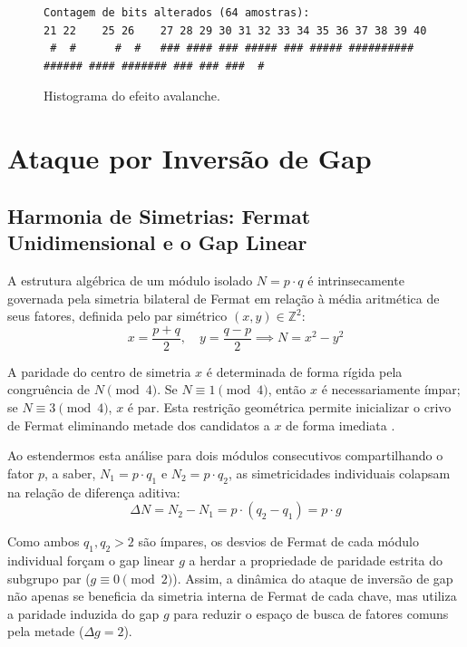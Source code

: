 \documentclass[12pt,a4paper]{article}
\theoremstyle{plain}
\begin{document}
\begin{figure}[htbp]
\centering
\begin{minipage}{0.7\textwidth}
\centering
\vspace{0.5cm}
{\footnotesize
\begin{verbatim}
Contagem de bits alterados (64 amostras):
21 22    25 26    27 28 29 30 31 32 33 34 35 36 37 38 39 40
 #  #      #  #   ### #### ### ##### ### ##### ########## ###### #### ####### ### ### ###  #
\end{verbatim}
}
\caption{Histograma do efeito avalanche.}
\label{fig:hist_avalanche}
\end{minipage}
\end{figure}

\section{Ataque por Inversão de Gap}
\label{sec:gap_inversion}

\subsection{Harmonia de Simetrias: Fermat Unidimensional e o Gap Linear}

A estrutura algébrica de um módulo isolado $N = p \cdot q$ é
intrinsecamente governada pela simetria bilateral de Fermat em relação
à média aritmética de seus fatores, definida pelo par simétrico
$(x, y) \in \mathbb{Z}^2$:
\[
x = \frac{p+q}{2}, \quad
y = \frac{q-p}{2} \implies
N = x^2 - y^2
\]

A paridade do centro de simetria $x$ é determinada de forma rígida
pela congruência de $N \pmod 4$.  Se $N \equiv 1 \pmod 4$, então $x$ é
necessariamente ímpar; se $N \equiv 3 \pmod 4$, $x$ é par.  Esta
restrição geométrica permite inicializar o crivo de Fermat eliminando
metade dos candidatos a $x$ de forma imediata
\cite{riesel1994}.

Ao estendermos esta análise para dois módulos consecutivos
compartilhando o fator $p$, a saber, $N_1 = p \cdot q_1$ e
$N_2 = p \cdot q_2$, as simetricidades individuais colapsam na relação
de diferença aditiva:
\[
\Delta N = N_2 - N_1 = p \cdot (q_2 - q_1) = p \cdot g
\]

Como ambos $q_1, q_2 > 2$ são ímpares, os desvios de Fermat de cada
módulo individual forçam o gap linear $g$ a herdar a propriedade de
paridade estrita do subgrupo par ($g \equiv 0 \pmod 2$).  Assim, a
dinâmica do ataque de inversão de gap não apenas se beneficia da
simetria interna de Fermat de cada chave, mas utiliza a paridade
induzida do gap $g$ para reduzir o espaço de busca de fatores comuns
pela metade ($\Delta g = 2$).
\end{document}
